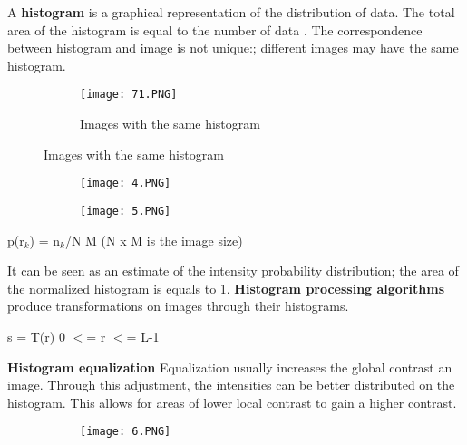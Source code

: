 \documentclass{article}
\begin{document}
A \textbf{histogram} is a graphical representation of the distribution of data. The total area of the histogram is equal to the number of data .  The correspondence between histogram and image is not unique:; different images may have the same histogram.

\begin{figure}[ht!]
  \centering
  \begin{subfigure}[b]{0.4\linewidth}
    \texttt{[image: 71.PNG]}
\caption{Images with the same histogram}
  \end{subfigure}
\end{figure}

\vspace{40mm}


\begin{figure}[ht!]
  \centering
  \begin{subfigure}[b]{0.5\linewidth}
    \texttt{[image: 4.PNG]}
  \end{subfigure}
     \begin{subfigure}[b]{0.49\textwidth}
         \centering
         \texttt{[image: 5.PNG]}
     \end{subfigure}
\end{figure}

\begin{center}
    p(r$_k$) = n$_k$/N M (N x M is the image size)
\end{center}
It can be seen as an estimate of the intensity probability distribution; the area of the normalized histogram is equals to 1.
\textbf{Histogram processing algorithms} produce transformations on images through their histograms.
\begin{center}
    s = T(r) 0 $<$= r $<$= L-1
\end{center}
 \vspace{2mm}
 
 \textbf{Histogram equalization} 
 \vspace{2mm}
 Equalization usually increases the global contrast an image. Through this adjustment, the intensities can be better distributed on the histogram. This allows for areas of lower local contrast to gain a higher contrast.
 
 \begin{figure}[ht!]
  \centering
  \begin{subfigure}[b]{0.7\linewidth}
    \texttt{[image: 6.PNG]}
  \end{subfigure}
\end{figure}
\end{document}
